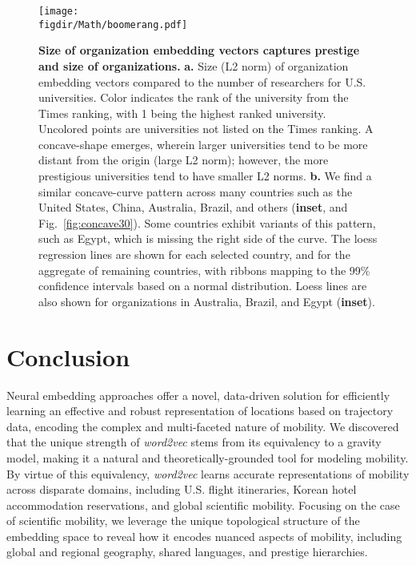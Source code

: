 \documentclass[12pt]{article} %
\def\figdir{../Figs}
\begin{document}
%
%
\begin{figure}[h!]
	\centering
	\texttt{[image: \\figdir/Math/boomerang.pdf]}
	\caption{
		\textbf{Size of organization embedding vectors captures prestige and size of organizations.}
		\textbf{a.} Size (L2 norm) of organization embedding vectors compared to the number of researchers for U.S. universities.
		Color indicates the rank of the university from the Times ranking, with 1 being the highest ranked university.
		Uncolored points are universities not listed on the Times ranking.
		A concave-shape emerges, wherein larger universities tend to be more distant from the origin (large L2 norm); however, the more prestigious universities tend to have smaller L2 norms.
		\textbf{b.} We find a similar concave-curve pattern across many countries such as the United States, China, Australia, Brazil, and others (\textbf{inset}, and Fig.~\ref{fig:concave30}).
		Some countries exhibit variants of this pattern, such as Egypt, which is missing the right side of the curve.
		The loess regression lines are shown for each selected country, and for the aggregate of remaining countries, with ribbons mapping to the 99\% confidence intervals based on a normal distribution.
		Loess lines are also shown for organizations in Australia, Brazil, and Egypt (\textbf{inset}).
	}
	\label{fig:length}
\end{figure}


%
%
\section*{Conclusion}

Neural embedding approaches offer a novel, data-driven solution for efficiently learning an effective and robust representation of locations based on trajectory data, encoding the complex and multi-faceted nature of mobility.
We discovered that the unique strength of \textit{word2vec} stems from its equivalency to a gravity model, making it a natural and theoretically-grounded tool for modeling mobility.
By virtue of this equivalency, \textit{word2vec} learns accurate representations of mobility across disparate domains, including U.S. flight itineraries, Korean hotel accommodation reservations, and global scientific mobility.
Focusing on the case of scientific mobility, we leverage the unique topological structure of the embedding space to reveal how it encodes nuanced aspects of mobility, including global and regional geography, shared languages, and prestige hierarchies.
\end{document}
